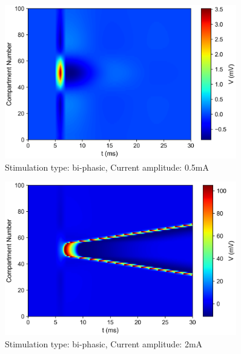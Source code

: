 \documentclass{scrartcl}
\begin{document}
\newpage
\begin{figure}[h]
	\centering
	\includegraphics[width=0.9\textwidth]{figures/potential_SimulationType.bi_amp0.0005.png}
	\caption{Stimulation type: bi-phasic, Current amplitude: 0.5mA}
	\label{fig:sim3}
\end{figure}
\begin{figure}[h!]
	\centering
	\includegraphics[width=0.9\textwidth]{figures/potential_SimulationType.bi_amp0.002.png}
	\caption{Stimulation type: bi-phasic, Current amplitude: 2mA}
	\label{fig:sim4}
\end{figure}
\end{document}
